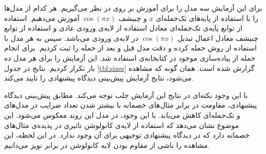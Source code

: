 \documentclass[12pt,onecolumn,a4paper]{article}
\begin{document}
برای این آزمایش سه مدل را برای آموزش بر روی
در نظر می‌گیریم. هر کدام از مدل‌ها را با استفاده از پایه‌های تک‌جمله‌ای $x$ و چبیشف $\cos(\pi x)$ آموزش می‌دهیم. استفاده از توابع پایه‌ی تک‌جمله‌ای معادل استفاده از لایه‌ی ورودی عادی و استفاده از توابع چبیشف معادل اعمال تبدیل $\cos(\pi x)$ در لایه‌ی ورودی می‌باشد. سپس به هر مدل با استفاده از روش
حمله کرده و  دقت مدل قبل و بعد از حمله را ثبت کردیم. برای انجام حمله از پیاده‌سازی موجود در کتابخانه‌ی  استفاده شد. این آزمایش را برای هر مدل ده بار تکرار کردیم. نتایج در جدول
\ref{tbl:sizes}
گزارش شده است. همان گونه که مشاهده می‌شود، نتایج آزمایش پیش‌بینی دیدگاه پیشنهادی را تایید می‌کند.

\begin{table}[]
    \begin{latin}
    \end{latin}
    \caption{مدل‌های استفاده شده در آزمایش، ابعاد آنها و دقت آنها قبل و پس از حمله‌ی . همان طور که مشاهده می‌شود، استفاده از توابع پایه‌ی چبیشف به صورت معنی داری باعث بهبود مقاومت در برابر حمله می‌شود.}
    \label{tbl:sizes}
\end{table}
با این وجود نکته‌ای در نتایج این آزمایش جلب توجه می‌کند. مطابق پیش‌بینی دیدگاه پیشنهادی، مقاومت در برابر مثال‌های خصمانه با بیشتر شدن تعداد ضرایب در مدل‌های  و  تک‌جمله‌ای کاهش می‌یابد. با این وجود، در مدل  این روند معکوس می‌شود. این موضوع نشان می‌دهد که استفاده از لایه‌ی کانولوشن تاثیری در پدیده‌ی مثال‌های خصمانه دارد که در دیدگاه پیشنهادی توجیهی برای آن وجود ندارد. در این لحظه، این مشاهده را ناشی از مقاوم بودن لایه کانولوشن در برابر نویز می‌دانیم.
\end{document}
